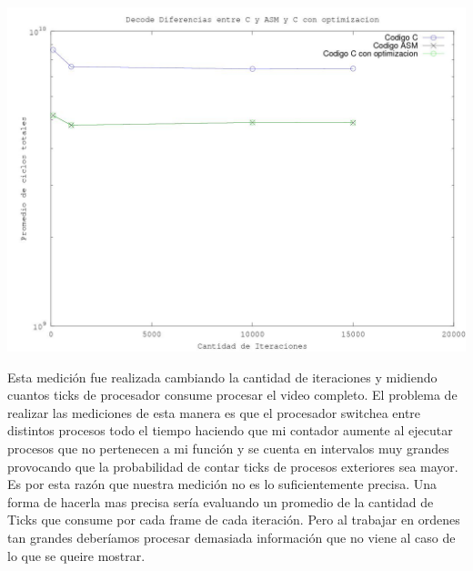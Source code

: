 \begin{itemize}
\begin{center}
 \includegraphics[scale=0.5]{imagenes/optimizacionC.jpg}
\end{center}

Esta medici\'on fue realizada cambiando la cantidad de iteraciones y midiendo cuantos ticks de procesador consume procesar el video completo. El 
problema de realizar las mediciones de esta manera es que el procesador switchea entre distintos procesos todo el tiempo haciendo que mi contador aumente
 al ejecutar procesos que no pertenecen a mi funci\'on y se cuenta en intervalos muy grandes provocando que la probabilidad de contar ticks de procesos
 exteriores sea mayor. Es por esta raz\'on que nuestra medici\'on no es lo suficientemente precisa. Una forma de hacerla mas precisa ser\'ia evaluando un
promedio de la cantidad de Ticks que consume por cada frame de cada iteraci\'on. Pero al trabajar en ordenes tan grandes deber\'iamos procesar demasiada
 informaci\'on que no viene al caso de lo que se queire mostrar.\newline

\end{itemize}

